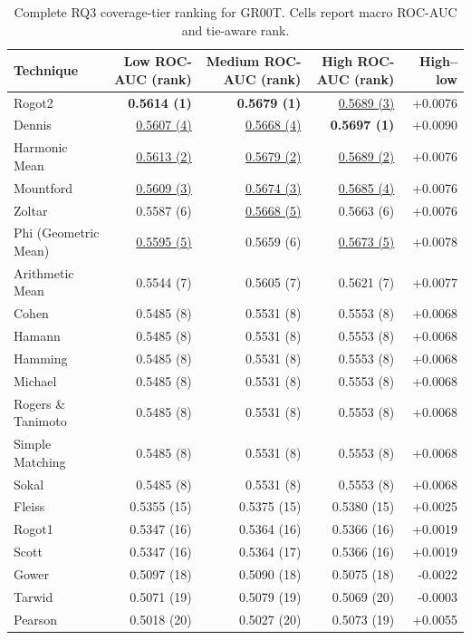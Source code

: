\begin{table}[t]
\centering
\caption{Complete RQ3 coverage-tier ranking for GR00T. Cells report macro ROC-AUC and tie-aware rank.}
\label{tab:rq3-supplementary-rankings-gr00t}
{\scriptsize
\setlength{\tabcolsep}{5pt}
\begin{tabular}{lrrrr}
\toprule
Technique & Low ROC-AUC (rank) & Medium ROC-AUC (rank) & High ROC-AUC (rank) & High--low \\
\midrule
Rogot2 & \textbf{0.5614 (1)} & \textbf{0.5679 (1)} & \underline{0.5689 (3)} & +0.0076 \\
Dennis & \underline{0.5607 (4)} & \underline{0.5668 (4)} & \textbf{0.5697 (1)} & +0.0090 \\
Harmonic Mean & \underline{0.5613 (2)} & \underline{0.5679 (2)} & \underline{0.5689 (2)} & +0.0076 \\
Mountford & \underline{0.5609 (3)} & \underline{0.5674 (3)} & \underline{0.5685 (4)} & +0.0076 \\
Zoltar & 0.5587 (6) & \underline{0.5668 (5)} & 0.5663 (6) & +0.0076 \\
Phi (Geometric Mean) & \underline{0.5595 (5)} & 0.5659 (6) & \underline{0.5673 (5)} & +0.0078 \\
Arithmetic Mean & 0.5544 (7) & 0.5605 (7) & 0.5621 (7) & +0.0077 \\
Cohen & 0.5485 (8) & 0.5531 (8) & 0.5553 (8) & +0.0068 \\
Hamann & 0.5485 (8) & 0.5531 (8) & 0.5553 (8) & +0.0068 \\
Hamming & 0.5485 (8) & 0.5531 (8) & 0.5553 (8) & +0.0068 \\
Michael & 0.5485 (8) & 0.5531 (8) & 0.5553 (8) & +0.0068 \\
Rogers \& Tanimoto & 0.5485 (8) & 0.5531 (8) & 0.5553 (8) & +0.0068 \\
Simple Matching & 0.5485 (8) & 0.5531 (8) & 0.5553 (8) & +0.0068 \\
Sokal & 0.5485 (8) & 0.5531 (8) & 0.5553 (8) & +0.0068 \\
Fleiss & 0.5355 (15) & 0.5375 (15) & 0.5380 (15) & +0.0025 \\
Rogot1 & 0.5347 (16) & 0.5364 (16) & 0.5366 (16) & +0.0019 \\
Scott & 0.5347 (16) & 0.5364 (17) & 0.5366 (16) & +0.0019 \\
Gower & 0.5097 (18) & 0.5090 (18) & 0.5075 (18) & -0.0022 \\
Tarwid & 0.5071 (19) & 0.5079 (19) & 0.5069 (20) & -0.0003 \\
Pearson & 0.5018 (20) & 0.5027 (20) & 0.5073 (19) & +0.0055 \\

\end{tabular}}
\end{table}
